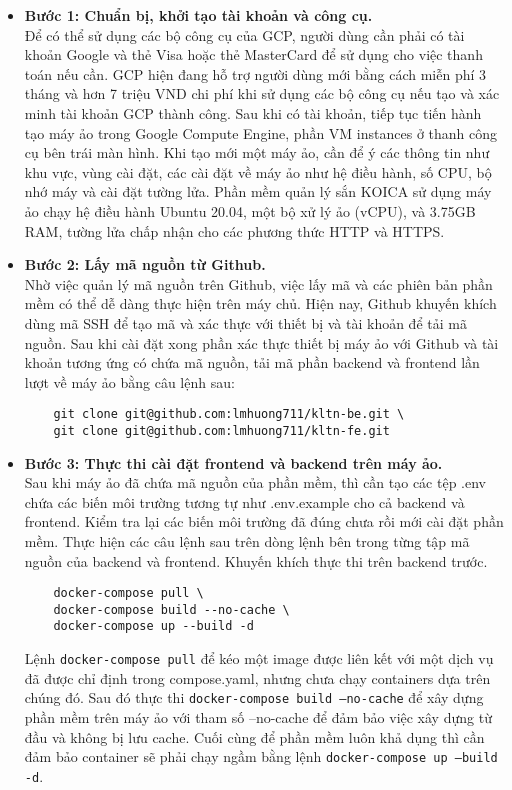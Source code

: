 \documentclass[./../main.tex]{subfiles}
\begin{document}
\begin{itemize}
    \item \textbf{Bước 1: Chuẩn bị, khởi tạo tài khoản và công cụ.}\\
    Để có thể sử dụng các bộ công cụ của GCP, người dùng cần phải có tài khoản Google và thẻ Visa hoặc thẻ MasterCard để sử dụng cho việc thanh toán nếu cần. GCP hiện đang hỗ trợ người dùng mới bằng cách miễn phí 3 tháng và hơn 7 triệu VND chi phí khi sử dụng các bộ công cụ nếu tạo và xác minh tài khoản GCP thành công. Sau khi có tài khoản, tiếp tục tiến hành tạo máy ảo trong Google Compute Engine, phần VM instances ở thanh công cụ bên trái màn hình. Khi tạo mới một máy ảo, cần để ý các thông tin như khu vực, vùng cài đặt, các cài đặt về máy ảo như hệ điều hành, số CPU, bộ nhớ máy và cài đặt tường lửa. Phần mềm quản lý sắn KOICA sử dụng máy ảo chạy hệ điều hành Ubuntu 20.04, một bộ xử lý ảo (vCPU), và 3.75GB RAM, tường lửa chấp nhận cho các phương thức HTTP và HTTPS. 
    \item \textbf{Bước 2: Lấy mã nguồn từ Github.}\\
    Nhờ việc quản lý mã nguồn trên Github, việc lấy mã và các phiên bản phần mềm có thể dễ dàng thực hiện trên máy chủ. Hiện nay, Github khuyến khích dùng mã SSH để tạo mã và xác thực với thiết bị và tài khoản để tải mã nguồn. Sau khi cài đặt xong phần xác thực thiết bị máy ảo với Github và tài khoản tương ứng có chứa mã nguồn, tải mã phần backend và frontend lần lượt về máy ảo bằng câu lệnh sau:\\
    \begin{verbatim}
    git clone git@github.com:lmhuong711/kltn-be.git \
    git clone git@github.com:lmhuong711/kltn-fe.git
    \end{verbatim}
    \item \textbf{Bước 3: Thực thi cài đặt frontend và backend trên máy ảo.}\\
    Sau khi máy ảo đã chứa mã nguồn của phần mềm, thì cần tạo các tệp .env chứa các biến môi trường tương tự như .env.example cho cả backend và frontend. Kiểm tra lại các biến môi trường đã đúng chưa rồi mới cài đặt phần mềm. Thực hiện các câu lệnh sau trên dòng lệnh bên trong từng tập mã nguồn của backend và frontend. Khuyến khích thực thi trên backend trước.
    \begin{verbatim}
    docker-compose pull \
    docker-compose build --no-cache \
    docker-compose up --build -d
    \end{verbatim}
    Lệnh \texttt{docker-compose pull} để kéo một image được liên kết với một dịch vụ đã được chỉ định trong compose.yaml, nhưng chưa chạy containers dựa trên chúng đó. Sau đó thực thi \texttt{docker-compose build --no-cache} để xây dựng phần mềm trên máy ảo với tham số --no-cache để đảm bảo việc xây dựng từ đầu và không bị lưu cache. Cuối cùng để phần mềm luôn khả dụng thì cần đảm bảo container sẽ phải chạy ngầm bằng lệnh \texttt{docker-compose up --build -d}.\\

\end{itemize}
\end{document}
